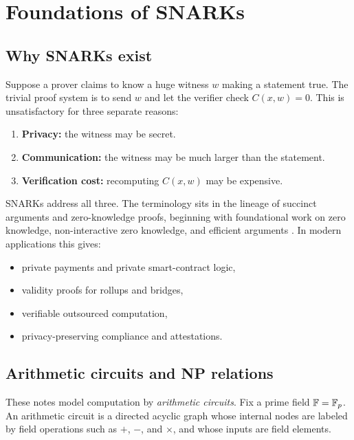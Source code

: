 \section{Foundations of SNARKs}
\label{sec:foundations}

\subsection{Why SNARKs exist}

Suppose a prover claims to know a huge witness $w$ making a statement true. The trivial proof system is to send $w$ and let the verifier check $C(x,w)=0$. This is unsatisfactory for three separate reasons:
\begin{enumerate}[leftmargin=2em]
    \item \textbf{Privacy:} the witness may be secret.
    \item \textbf{Communication:} the witness may be much larger than the statement.
    \item \textbf{Verification cost:} recomputing $C(x,w)$ may be expensive.
\end{enumerate}

SNARKs address all three. The terminology sits in the lineage of succinct arguments and zero-knowledge proofs, beginning with foundational work on zero knowledge, non-interactive zero knowledge, and efficient arguments \cite{GoldwasserMicaliRackoff1989,BlumFeldmanMicali1988,Kilian1992}. In modern applications this gives:
\begin{itemize}[leftmargin=2em]
    \item private payments and private smart-contract logic,
    \item validity proofs for rollups and bridges,
    \item verifiable outsourced computation,
    \item privacy-preserving compliance and attestations.
\end{itemize}

\subsection{Arithmetic circuits and NP relations}

These notes model computation by \emph{arithmetic circuits}. Fix a prime field $\mathbb{F}=\mathbb{F}_p$. An arithmetic circuit is a directed acyclic graph whose internal nodes are labeled by field operations such as $+$, $-$, and $\times$, and whose inputs are field elements.

